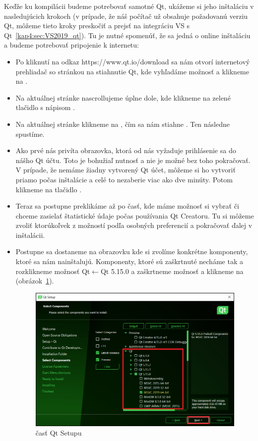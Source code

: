 Keďže ku kompilácii budeme potrebovať samotné Qt, ukážeme si jeho inštaláciu v nasledujúcich krokoch (v prípade, že náš počítač už obsahuje požadovanú verziu Qt, môžeme tieto kroky preskočiť a prejsť na integráciu VS s Qt~\ref{kap4:sec:VS2019_qt}). Tu je nutné spomenúť, že sa jedná o online inštaláciu a budeme potrebovať pripojenie k internetu:
\begin{itemize}
\item Po kliknutí na odkaz https://www.qt.io/download sa nám otvorí internetový prehliadač so stránkou na stiahnutie Qt, kde vyhľadáme možnosť  a klikneme na .

\item Na aktuálnej stránke nascrollujeme úplne dole, kde klikneme na zelené tlačidlo s nápisom .

\item Na aktuálnej stránke klikneme na , čím sa nám stiahne . Ten následne spustíme.

\item Ako prvé nás privíta obrazovka, ktorá od nás vyžaduje prihlásenie sa do nášho Qt účtu. Toto je bohužiaľ nutnosť a nie je možné bez toho pokračovať. V prípade, že nemáme žiadny vytvorený Qt účet, môžeme si ho vytvoriť priamo počas inštalácie a celé to nezaberie viac ako dve minúty. Potom klikneme na tlačidlo .

 \item Teraz sa postupne preklikáme až po časť, kde máme možnosť si vybrať či chceme zasielať štatistické údaje počas používania Qt Creatoru. Tu si môžeme zvoliť ktorúkoľvek z možností podľa osobných preferencií a pokračovať ďalej v inštalácii.
 
\item Postupne sa dostaneme na obrazovku kde si zvolíme konkrétne komponenty, ktoré sa nám nainštalujú. Komponenty, ktoré sú zaškrtnuté necháme tak a rozklikneme možnosť Qt$\leftarrow$Qt 5.15.0 a zaškrtneme možnosť  a klikneme na  (obrázok~\ref{obr:kap4:inst_sel}).

\begin{figure}[!htb]
	\centering
	\includegraphics[width=12cm]{img/kap04_inst_sel}
	\caption{ časť Qt Setupu}
	\label{obr:kap4:inst_sel}
\end{figure}


\end{itemize}
